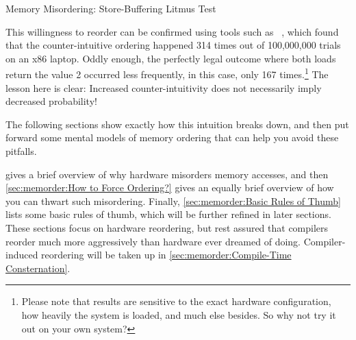 \begin{listing}

\caption{Memory Misordering:
			     Store-Buffering Litmus Test}
\label{lst:memorder:Memory Misordering: Store-Buffering Litmus Test}
\end{listing}

\QuickQuizEnd

This willingness to reorder can be confirmed using tools such as
~\cite{Alglave:2014:HCM:2594291.2594347},
which found that the counter-intuitive ordering happened
314 times out of 100,000,000 trials on an x86 laptop.
Oddly enough, the perfectly legal outcome where both loads return the
value 2 occurred less frequently, in this case, only 167 times.\footnote{
	Please note that results are sensitive to the exact hardware
	configuration,
	how heavily the system is loaded, and much else besides.
	So why not try it out on your own system?}
The lesson here is clear:
Increased counter-intuitivity does not necessarily imply decreased probability!

The following sections show exactly how this intuition breaks down,
and then put forward some mental models of memory ordering that can help
you avoid these pitfalls.

gives a brief overview of why hardware misorders memory accesses, and then
\cref{sec:memorder:How to Force Ordering?}
gives an equally brief overview of how you can thwart such misordering.
Finally, \cref{sec:memorder:Basic Rules of Thumb}
lists some basic rules of thumb, which will be further refined in
later sections.
These sections focus on hardware reordering, but rest assured that compilers
reorder much more aggressively than hardware ever dreamed of doing.
Compiler-induced reordering will be taken up in
\cref{sec:memorder:Compile-Time Consternation}.

